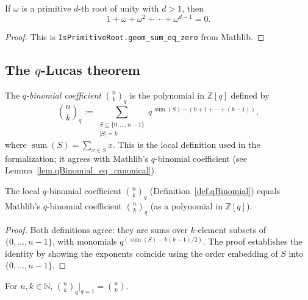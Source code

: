 \begin{lemma}
\label{lem.primitiveRoot_geom_sum}
\leanhelper
\leanok
If $\omega$ is a primitive $d$-th root of unity with $d > 1$, then
\[
1 + \omega + \omega^2 + \cdots + \omega^{d-1} = 0.
\]
\end{lemma}

\begin{proof}
\leanok
This is \texttt{IsPrimitiveRoot.geom\_sum\_eq\_zero} from Mathlib.
\end{proof}

\subsection{The \texorpdfstring{$q$}{q}-Lucas theorem}

\begin{definition}
\label{def.qBinomial}
\leanhelper
\leanok
The \emph{$q$-binomial coefficient} $\binom{n}{k}_q$ is the polynomial
in $\mathbb{Z}[q]$ defined by
\[
\binom{n}{k}_q := \sum_{\substack{S \subseteq \{0,\ldots,n-1\} \\ |S| = k}}
q^{\,\operatorname{sum}(S) - (0 + 1 + \cdots + (k-1))},
\]
where $\operatorname{sum}(S) = \sum_{x \in S} x$.
This is the local definition used in the formalization; it agrees with
Mathlib's $q$-binomial coefficient (see
Lemma~\ref{lem.qBinomial_eq_canonical}).
\end{definition}

\begin{lemma}
\label{lem.qBinomial_eq_canonical}
\leanhelper
\leanok
The local $q$-binomial coefficient
$\binom{n}{k}_q$ (Definition~\ref{def.qBinomial}) equals
Mathlib's $q$-binomial coefficient $\binom{n}{k}_q$ (as a polynomial
in $\mathbb{Z}[q]$).
\end{lemma}

\begin{proof}
\leanok
Both definitions agree: they are sums over $k$-element subsets of
$\{0,\ldots,n-1\}$, with monomials
$q^{(\operatorname{sum}(S) - k(k-1)/2)}$.
The proof establishes the identity by showing the exponents coincide
using the order embedding of $S$ into $\{0,\ldots,n-1\}$.
\end{proof}

\begin{lemma}
\label{lem.qBinomial_eval_one}
\leanhelper
\leanok
For $n, k \in \mathbb{N}$,
$\binom{n}{k}_q \big|_{q=1} = \binom{n}{k}$.
\end{lemma}

